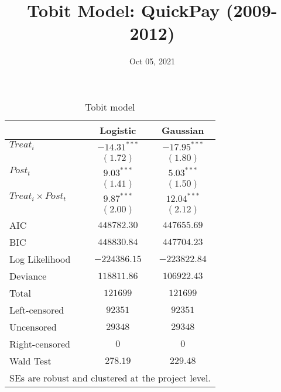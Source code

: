 \documentclass[
]{article}
\title{Tobit Model: QuickPay (2009-2012)}
\author{}
\date{\vspace{-2.5em}Oct 05, 2021}
\begin{document}
\maketitle

\begin{table}
\begin{center}
\begin{tabular}{l c c}
\hline
 & Logistic & Gaussian \\
\hline
$Treat_i$               & $-14.31^{***}$ & $-17.95^{***}$ \\
                        & $(1.72)$       & $(1.80)$       \\
$Post_t$                & $9.03^{***}$   & $5.03^{***}$   \\
                        & $(1.41)$       & $(1.50)$       \\
$Treat_i \times Post_t$ & $9.87^{***}$   & $12.04^{***}$  \\
                        & $(2.00)$       & $(2.12)$       \\
\hline
AIC                     & $448782.30$    & $447655.69$    \\
BIC                     & $448830.84$    & $447704.23$    \\
Log Likelihood          & $-224386.15$   & $-223822.84$   \\
Deviance                & $118811.86$    & $106922.43$    \\
Total                   & $121699$       & $121699$       \\
Left-censored           & $92351$        & $92351$        \\
Uncensored              & $29348$        & $29348$        \\
Right-censored          & $0$            & $0$            \\
Wald Test               & $278.19$       & $229.48$       \\
\hline
\multicolumn{3}{l}{\scriptsize{SEs are robust and clustered at the project level.}}
\end{tabular}
\caption{Tobit model}
\label{table:coefficients}
\end{center}
\end{table}
\end{document}
